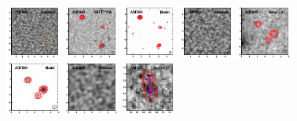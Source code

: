 \documentclass[iop]{emulateapj}
\begin{document}
\begin{figure}[!tbp]
\begin{centering}
\includegraphics[width=0.162\textwidth]{../Figures/modelfit/ADFS02_residual_bestfit.pdf}
\includegraphics[width=0.162\textwidth]{../Figures/modelfit/ADFS03_optical_bestfit.pdf}
\includegraphics[width=0.162\textwidth]{../Figures/modelfit/ADFS03_model_bestfit.pdf}
\includegraphics[width=0.162\textwidth]{../Figures/modelfit/ADFS03_residual_bestfit.pdf}
\includegraphics[width=0.162\textwidth]{../Figures/modelfit/ADFS04_optical_bestfit.pdf}
\includegraphics[width=0.162\textwidth]{../Figures/modelfit/ADFS04_model_bestfit.pdf}
\includegraphics[width=0.162\textwidth]{../Figures/modelfit/ADFS04_residual_bestfit.pdf}
\includegraphics[width=0.162\textwidth]{../Figures/modelfit/ADFS05_optical_bestfit.pdf}

\end{centering}
\end{figure}
\end{document}
